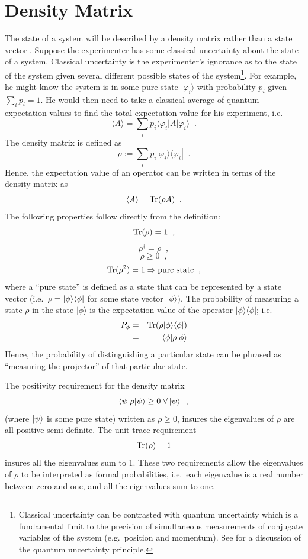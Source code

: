 \section{Density Matrix}
\label{sec:densitymatrix}
The state of a system will be described by a density matrix rather than a state vector \cite{vonNeumann1947,Landau1977,blum1996}.  Suppose the experimenter has some classical uncertainty about the state of a system.  Classical uncertainty is the experimenter's ignorance as to the state of the system given several different possible states of the system\footnote{Classical uncertainty can be contrasted with quantum uncertainty which is a fundamental limit to the precision of simultaneous measurements of conjugate variables of the system (e.g.\ position and momentum).  See \cite{Sakurai2010} for a discussion of the quantum uncertainty principle.}.  For example, he might know the system is in some pure state $|\varphi_i\rangle$ with probability $p_i$ given $\sum_i p_i =1$.  He would then need to take a classical average of quantum expectation values to find the total expectation value for his experiment, i.e.
$$
\langle A\rangle = \sum_i p_i \langle\varphi_i |A|\varphi_i\rangle\;\;.
$$
The density matrix is defined as
$$
\rho := \sum_i p_i |\varphi_i\rangle\langle\varphi_i|\;\;.
$$
Hence, the expectation value of an operator can be written in terms of the density matrix as
$$
\langle A\rangle = \operatorname{Tr}(\rho A)\;\;.
$$
The following properties follow directly from the definition:
$$\operatorname{Tr}(\rho) = 1\;\;,$$
$$\rho^\dagger=\rho\;\;,$$
$$\rho\ge 0\;\;,$$
$$\operatorname{Tr}(\rho^2) = 1 \Rightarrow \textrm{pure state}\;\;,$$
where a ``pure state'' is defined as a state that can be represented by a state vector (i.e.\ $\rho = |\phi\rangle\langle\phi|$ for some state vector $\left|\phi\right\rangle$).  The probability of measuring a state $\rho$ in the state $|\phi\rangle$ is the expectation value of the operator $|\phi\rangle\langle\phi|$; i.e.
\begin{eqnarray}
P_\phi &=& \operatorname{Tr}(\rho |\phi\rangle\langle\phi|) \\
&=& \langle\phi|\rho|\phi\rangle
\end{eqnarray}
Hence, the probability of distinguishing a particular state can be phrased as ``measuring the projector'' of that particular state.


The positivity requirement for the density matrix
$$
\langle \psi |\rho |\psi \rangle \ge 0\;\forall \left|\psi\right\rangle \;\;,
$$
(where $\left|\psi\right\rangle$ is some pure state) written as $\rho \ge 0$, insures the eigenvalues of $\rho$ are all positive semi-definite.  The unit trace requirement 
$$
\operatorname{Tr}(\rho) = 1
$$
insures all the eigenvalues sum to 1.  These two requirements allow the eigenvalues of $\rho$ to be interpreted as formal probabilities, i.e.\ each eigenvalue is a real number between zero and one, and all the eigenvalues sum to one.  

